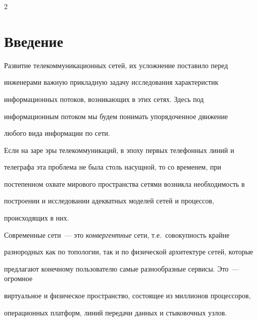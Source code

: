 \begin{multicols}{2}








\label{st\stat}





\section{Введение}





Развитие телекоммуникационных сетей, их усложнение поставило перед


инженерами важную прикладную задачу исследования характеристик


информационных потоков, возникающих в этих сетях. Здесь под


информационным потоком мы будем понимать упорядоченное движение


любого вида информации по сети.





Если на заре эры телекоммуникаций, в эпоху первых телефонных линий и


телеграфа эта проблема не была столь насущной, то со временем, при


постепенном охвате мирового пространства сетями возникла необходимость в


построении и исследовании адекватных моделей сетей и процессов,


происходящих в них.





\thispagestyle{headings}








Современные сети~--- это \textit{конвергентные} сети, т.е.\ совокупность крайне


разнородных как по топологии, так и по физической архитектуре сетей, которые


предлагают конечному пользователю самые разнообразные сервисы. Это~--- огромное


виртуальное и физическое пространство, состоящее из миллионов процессоров,


операционных платформ, линий передачи данных и стыковочных узлов.



\end{multicols}
